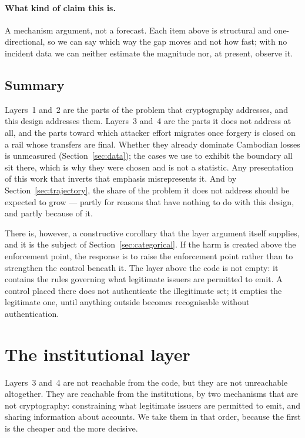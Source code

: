 \documentclass[10pt,a4paper,twocolumn]{article}
\begin{document}
\paragraph{What kind of claim this is.} A mechanism argument, not a forecast.
Each item above is structural and one-directional, so we can say which way the
gap moves and not how fast; with no incident data we can neither estimate the
magnitude nor, at present, observe it.

\subsection{Summary}

Layers~1 and~2 are the parts of the problem that cryptography addresses, and
this design addresses them. Layers~3 and~4 are the parts it does not address at all, and the parts toward
which attacker effort migrates once forgery is closed on a rail whose transfers
are final. Whether they already dominate Cambodian losses is unmeasured
(Section~\ref{sec:data}); the cases we use to exhibit the boundary all sit
there, which is why they were chosen and is not a statistic. Any presentation
of this work that inverts that emphasis misrepresents it. And by
Section~\ref{sec:trajectory}, the share of the problem it does not address
should be expected to grow --- partly for reasons that have nothing to do with
this design, and partly because of it.

There is, however, a constructive corollary that the layer argument itself
supplies, and it is the subject of Section~\ref{sec:categorical}. If the harm is
created above the enforcement point, the response is to raise the enforcement
point rather than to strengthen the control beneath it. The layer above the code
is not empty: it contains the rules governing what legitimate issuers are
permitted to emit. A control placed there does not authenticate the illegitimate
set; it empties the legitimate one, until anything outside becomes recognisable
without authentication.

\section{The institutional layer}
\label{sec:institutional}

Layers~3 and~4 are not reachable from the code, but they are not unreachable
altogether. They are reachable from the institutions, by two mechanisms that are
not cryptography: constraining what legitimate issuers are permitted to emit,
and sharing information about accounts. We take them in that order, because the
first is the cheaper and the more decisive.
\end{document}
